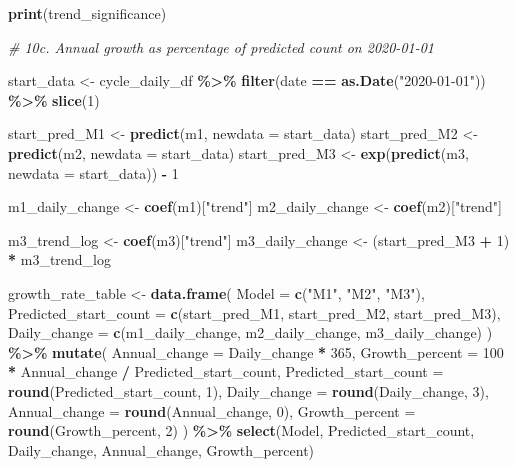 \documentclass[
]{article}
\newenvironment{Shaded}{\begin{snugshade}}{\end{snugshade}}
\newcommand{\AttributeTok}[1]{\textcolor[rgb]{0.13,0.29,0.53}{#1}}
\newcommand{\CommentTok}[1]{\textcolor[rgb]{0.56,0.35,0.01}{\textit{#1}}}
\newcommand{\DecValTok}[1]{\textcolor[rgb]{0.00,0.00,0.81}{#1}}
\newcommand{\FunctionTok}[1]{\textcolor[rgb]{0.13,0.29,0.53}{\textbf{#1}}}
\newcommand{\NormalTok}[1]{#1}
\newcommand{\OtherTok}[1]{\textcolor[rgb]{0.56,0.35,0.01}{#1}}
\newcommand{\SpecialCharTok}[1]{\textcolor[rgb]{0.81,0.36,0.00}{\textbf{#1}}}
\newcommand{\StringTok}[1]{\textcolor[rgb]{0.31,0.60,0.02}{#1}}
\begin{document}
\begin{Shaded}
\begin{Highlighting}[]
\FunctionTok{print}\NormalTok{(trend\_significance)}

\CommentTok{\# 10c. Annual growth as percentage of predicted count on 2020{-}01{-}01}

\NormalTok{start\_data }\OtherTok{\textless{}{-}}\NormalTok{ cycle\_daily\_df }\SpecialCharTok{\%\textgreater{}\%}
  \FunctionTok{filter}\NormalTok{(date }\SpecialCharTok{==} \FunctionTok{as.Date}\NormalTok{(}\StringTok{"2020{-}01{-}01"}\NormalTok{)) }\SpecialCharTok{\%\textgreater{}\%}
  \FunctionTok{slice}\NormalTok{(}\DecValTok{1}\NormalTok{)}

\NormalTok{start\_pred\_M1 }\OtherTok{\textless{}{-}} \FunctionTok{predict}\NormalTok{(m1, }\AttributeTok{newdata =}\NormalTok{ start\_data)}
\NormalTok{start\_pred\_M2 }\OtherTok{\textless{}{-}} \FunctionTok{predict}\NormalTok{(m2, }\AttributeTok{newdata =}\NormalTok{ start\_data)}
\NormalTok{start\_pred\_M3 }\OtherTok{\textless{}{-}} \FunctionTok{exp}\NormalTok{(}\FunctionTok{predict}\NormalTok{(m3, }\AttributeTok{newdata =}\NormalTok{ start\_data)) }\SpecialCharTok{{-}} \DecValTok{1}

\NormalTok{m1\_daily\_change }\OtherTok{\textless{}{-}} \FunctionTok{coef}\NormalTok{(m1)[}\StringTok{"trend"}\NormalTok{]}
\NormalTok{m2\_daily\_change }\OtherTok{\textless{}{-}} \FunctionTok{coef}\NormalTok{(m2)[}\StringTok{"trend"}\NormalTok{]}

\NormalTok{m3\_trend\_log }\OtherTok{\textless{}{-}} \FunctionTok{coef}\NormalTok{(m3)[}\StringTok{"trend"}\NormalTok{]}
\NormalTok{m3\_daily\_change }\OtherTok{\textless{}{-}}\NormalTok{ (start\_pred\_M3 }\SpecialCharTok{+} \DecValTok{1}\NormalTok{) }\SpecialCharTok{*}\NormalTok{ m3\_trend\_log}

\NormalTok{growth\_rate\_table }\OtherTok{\textless{}{-}} \FunctionTok{data.frame}\NormalTok{(}
  \AttributeTok{Model =} \FunctionTok{c}\NormalTok{(}\StringTok{"M1"}\NormalTok{, }\StringTok{"M2"}\NormalTok{, }\StringTok{"M3"}\NormalTok{),}
  \AttributeTok{Predicted\_start\_count =} \FunctionTok{c}\NormalTok{(start\_pred\_M1, start\_pred\_M2, start\_pred\_M3),}
  \AttributeTok{Daily\_change =} \FunctionTok{c}\NormalTok{(m1\_daily\_change, m2\_daily\_change, m3\_daily\_change)}
\NormalTok{) }\SpecialCharTok{\%\textgreater{}\%}
  \FunctionTok{mutate}\NormalTok{(}
    \AttributeTok{Annual\_change =}\NormalTok{ Daily\_change }\SpecialCharTok{*} \DecValTok{365}\NormalTok{,}
    \AttributeTok{Growth\_percent =} \DecValTok{100} \SpecialCharTok{*}\NormalTok{ Annual\_change }\SpecialCharTok{/}\NormalTok{ Predicted\_start\_count,}
    \AttributeTok{Predicted\_start\_count =} \FunctionTok{round}\NormalTok{(Predicted\_start\_count, }\DecValTok{1}\NormalTok{),}
    \AttributeTok{Daily\_change =} \FunctionTok{round}\NormalTok{(Daily\_change, }\DecValTok{3}\NormalTok{),}
    \AttributeTok{Annual\_change =} \FunctionTok{round}\NormalTok{(Annual\_change, }\DecValTok{0}\NormalTok{),}
    \AttributeTok{Growth\_percent =} \FunctionTok{round}\NormalTok{(Growth\_percent, }\DecValTok{2}\NormalTok{)}
\NormalTok{  ) }\SpecialCharTok{\%\textgreater{}\%}
  \FunctionTok{select}\NormalTok{(Model, Predicted\_start\_count, Daily\_change, Annual\_change, Growth\_percent)}


\end{Highlighting}
\end{Shaded}
\end{document}
